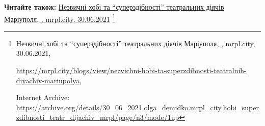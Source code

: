  
 
 
 
 

\def\pubIA{https://archive.org/details/30_06_2021.olga_demidko.mrpl_city.hobi_superzdibnosti_teatr_dijachiv_mrpl/page/n3/mode/1up}
\def\pubTitle{Незвичні хобі та \enquote{суперздібності} театральних діячів Маріуполя}
\def\pubDate{30.06.2021}
\def\pubOrigin{https://mrpl.city/blogs/view/nezvichni-hobi-ta-superzdibnosti-teatralnih-diyachiv-mariupolya}
\def\pubAuthor{\pubAuthorDemidko}

\textbf{Читайте також:} \href{\pubIA}{%
\pubTitle, \pubAuthor, mrpl.city, \pubDate}%
\footnote{\pubTitle, \pubAuthor, mrpl.city, \pubDate, \par\url{\pubOrigin}, \par Internet Archive: \url{\pubIA}}
